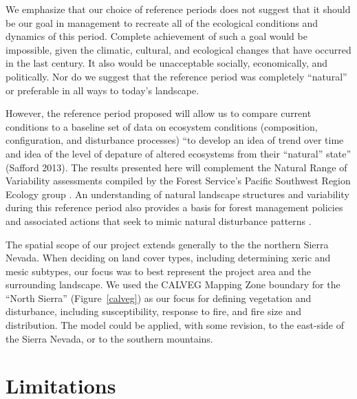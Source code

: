 We emphasize that our choice of reference periods does not suggest that it should be our goal in management to recreate all of the ecological conditions and dynamics of this period. Complete achievement of such a goal would be impossible, given the climatic, cultural, and ecological changes that have occurred in the last century. It also would be unacceptable socially, economically, and politically. Nor do we suggest that the reference period was completely ``natural'' or preferable in all ways to today’s landscape. 


However, the reference period proposed will allow us to compare current conditions to a baseline set of data on ecosystem conditions (composition, configuration, and disturbance processes) ``to develop an idea of trend over time and idea of the level of depature of altered ecosystems from their ``natural'' state'' (Safford 2013). The results presented here will complement the Natural Range of Variability assessments compiled by the Forest Service's Pacific Southwest Region Ecology group \citep[e.g.,][]{Safford2013,Merriam2013,Meyer2013a,Meyer2013,Estes2013,Estes2013a,Gross2013}. An understanding of natural landscape structures and variability during this reference period also provides a basis for forest management policies and associated actions that seek to mimic natural disturbance patterns \cite{Romme2000,Buse2002}.

The spatial scope of our project extends generally to the the northern Sierra Nevada. When deciding on land cover types, including determining xeric and mesic subtypes, our focus was to best represent the project area and the surrounding landscape. We used the CALVEG Mapping Zone boundary for the ``North Sierra'' (Figure~\ref{calveg}) as our focus for defining vegetation and disturbance, including susceptibility, response to fire, and fire size and distribution. The model could be applied, with some revision, to the east-side of the Sierra Nevada, or to the southern mountains.

\section{Limitations}

